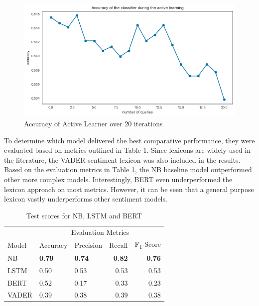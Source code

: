 \documentclass[11pt, a4paper]{article}
\begin{document}
\begin{figure}
    \centering
    \includegraphics[width=\textwidth]{ActiveLearner.png}
    \caption{Accuracy of Active Learner over 20 iterations}
    \label{fig:ActiveLearner}
\end{figure}

To determine which model delivered the best comparative performance, they were evaluated based on metrics outlined in Table 1. Since lexicons are widely used in the literature,
the VADER sentiment lexicon was also included in the results.
Based on the evaluation metrics in Table 1, the NB baseline model outperformed other more complex models. Interestingly, BERT even underperformed the lexicon approach on most metrics.
However, it can be seen that a general purpose lexicon vastly underperforms other sentiment models.

\begin{table}
    \caption{Test scores for NB, LSTM and BERT}
    \label{tab:results}
    \centering
    \small

    \begin{tabular}{lllrr}
        \toprule
                                        & \multicolumn{4}{c}{Evaluation Metrics} \\
                                        \cmidrule{2-5}
                            Model       & Accuracy      & Precision     & Recall    & F\textsubscript{1}-Score \\
            \midrule
            \multirow{1}{*}{NB}         & \textbf{0.79}          & \textbf{0.74}          & \textbf{0.82}      & \textbf{0.76}                      \\
            \midrule
            \multirow{1}{*}{LSTM}       & 0.50          & 0.53          & 0.53      & 0.53                      \\
            \midrule
            \multirow{1}{*}{BERT}       & 0.52          & 0.17          & 0.33      & 0.23                      \\
            \midrule
            \multirow{1}{*}{VADER}      & 0.39          & 0.38          & 0.39      & 0.38                      \\

        \bottomrule
    \end{tabular}

\end{table}
\end{document}
